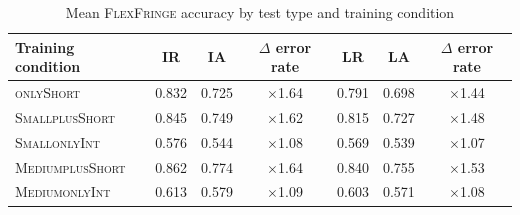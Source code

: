 \documentclass[twoside,11pt]{article}
\newcommand{\tscx}[1]{\textsc{#1}\xspace}
\newcommand{\sm}{\tscx{Small}}
\newcommand{\med}{\tscx{Medium}}
\newcommand{\origRand}{IR\xspace}
\newcommand{\longRand}{LR\xspace}
\newcommand{\origAdv}{IA\xspace}
\newcommand{\longAdv}{LA\xspace}
\newcommand{\onlyShort}{\tscx{onlyShort}}
\newcommand{\plusShort}{\tscx{plusShort}}
\newcommand{\onlyInt}{\tscx{onlyInt}}
\begin{document}


\begin{table}[t]
	\centering
	\begin{tabular}{lccc:ccc}
		\toprule
		Training condition & \origRand & \origAdv & $\Delta$ error rate & \longRand & \longAdv & $\Delta$ error rate \\
		\midrule                                                
		\onlyShort         & 0.832    & 0.725    & $\times$1.64   & 0.791    & 0.698    & $\times$1.44   \\
		\sm \plusShort     & 0.845    & 0.749    & $\times$1.62   & 0.815    & 0.727    & $\times$1.48   \\
		\sm \onlyInt       & 0.576    & 0.544    & $\times$1.08   & 0.569    & 0.539    & $\times$1.07   \\
		\med \plusShort    & 0.862    & 0.774    & $\times$1.64   & 0.840    & 0.755    & $\times$1.53   \\
		\med \onlyInt      & 0.613    & 0.579    & $\times$1.09   & 0.603    & 0.571    & $\times$1.08   \\
		\bottomrule
	\end{tabular}
	\caption{Mean \textsc{FlexFringe} accuracy by test type and training condition}
	\label{tab:ff-acc-test-set-by-train}
\end{table}
\end{document}
